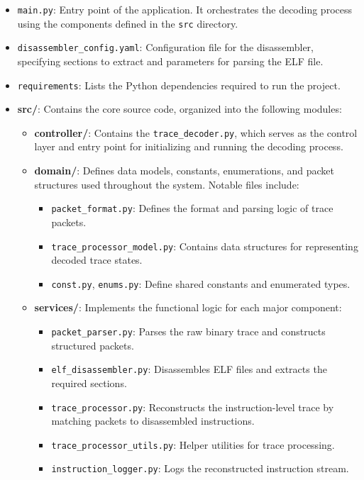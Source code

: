 \documentclass[a4paper,12pt]{article}
\begin{document}
\begin{itemize}
    \item \texttt{main.py}: Entry point of the application. It orchestrates the decoding process using the components defined in the \texttt{src} directory.
    \item \texttt{disassembler\_config.yaml}: Configuration file for the disassembler, specifying sections to extract and parameters for parsing the ELF file.
    \item \texttt{requirements}: Lists the Python dependencies required to run the project.
    \item \textbf{src/}: Contains the core source code, organized into the following modules:
    \begin{itemize}
        \item \textbf{controller/}: Contains the \texttt{trace\_decoder.py}, which serves as the control layer and entry point for initializing and running the decoding process.
        \item \textbf{domain/}: Defines data models, constants, enumerations, and packet structures used throughout the system. Notable files include:
        \begin{itemize}
            \item \texttt{packet\_format.py}: Defines the format and parsing logic of trace packets.
            \item \texttt{trace\_processor\_model.py}: Contains data structures for representing decoded trace states.
            \item \texttt{const.py}, \texttt{enums.py}: Define shared constants and enumerated types.
        \end{itemize}
        \item \textbf{services/}: Implements the functional logic for each major component:
        \begin{itemize}
            \item \texttt{packet\_parser.py}: Parses the raw binary trace and constructs structured packets.
            \item \texttt{elf\_disassembler.py}: Disassembles ELF files and extracts the required sections.
            \item \texttt{trace\_processor.py}: Reconstructs the instruction-level trace by matching packets to disassembled instructions.
            \item \texttt{trace\_processor\_utils.py}: Helper utilities for trace processing.
            \item \texttt{instruction\_logger.py}: Logs the reconstructed instruction stream.
        \end{itemize}
    \end{itemize}
    

\end{itemize}
\end{document}
